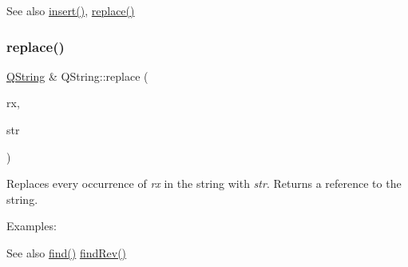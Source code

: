 \begin{DoxySeeAlso}{See also}
\mbox{\hyperlink{class_q_string_a3733066010481ab1e8f037bd99045269}{insert()}}, \mbox{\hyperlink{class_q_string_aa785aa8e254ae8704f1a960245f3337e}{replace()}} 
\end{DoxySeeAlso}
\mbox{\label{class_q_string_aaee914b4744ada084543c212bc1b3a21}} 
\subsubsection{\texorpdfstring{replace()}{replace()}\hspace{0.1cm}{\footnotesize\ttfamily [1/3]}}
{\footnotesize\ttfamily \mbox{\hyperlink{class_q_string}{Q\+String}} \& Q\+String\+::replace (\begin{DoxyParamCaption}\item[{const \mbox{\hyperlink{class_q_reg_exp}{Q\+Reg\+Exp}} \&}]{rx,  }\item[{const \mbox{\hyperlink{class_q_string}{Q\+String}} \&}]{str }\end{DoxyParamCaption})}

Replaces every occurrence of {\itshape rx} in the string with {\itshape str}. Returns a reference to the string.

Examples\+: 
\begin{DoxyCode}{0}
\DoxyCodeLine{}
\DoxyCodeLine{}
\end{DoxyCode}


\begin{DoxySeeAlso}{See also}
\mbox{\hyperlink{class_q_string_a675617012888ffd3acc8aef4aed05690}{find()}} \mbox{\hyperlink{class_q_string_a97b5c9712f3f145d52f91d816763ceea}{find\+Rev()}} 
\end{DoxySeeAlso}
\mbox{\label{class_q_string_a61605f13535774a3b048370a04aff78c}} 
